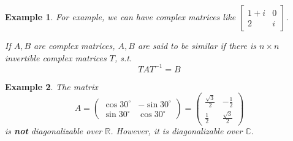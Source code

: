 \documentclass{article}
\theoremstyle{MyNonumberplain}
\theoremstyle{break}
\theoremstyle{break}
\newtheorem{example}{Example}[section]
\theoremstyle{break}
\theoremstyle{definition}
\theoremstyle{break}
\begin{document}
\begin{expbox}
    \begin{example}
        For example, we can have complex matrices like $\left[\begin{array}{cc}
            1 + i & 0\\
            2 & i
          \end{array}\right]$.\bigskip
          
          If $A, B$ are complex matrices, $A, B$ are said to be similar if there is $ n
          \times n$ invertible complex matrices $T$, s.t.
          \[ T A T^{- 1} = B \]  
    \end{example}
\end{expbox}

\begin{expbox}
    \begin{example}
        The matrix
        \[ A = \left(\begin{array}{cc}
             \cos 30^{\circ} & - \sin 30^{\circ}\\
             \sin 30^{\circ} & \cos 30^{\circ}
           \end{array}\right) = \left(\begin{array}{cc}
             \frac{\sqrt{3}}{2} & - \frac{1}{2}\\
             \frac{1}{2} & \frac{\sqrt{3}}{2}
           \end{array}\right) \]
        is \textbf{not} diagonalizable over $\mathbb{R}$. However, it is
        diagonalizable over $\mathbb{C}$.
    \end{example}
\end{expbox}
\end{document}
